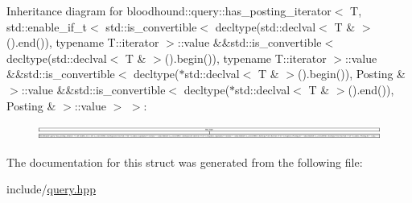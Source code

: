 Inheritance diagram for bloodhound\+:\+:query\+:\+:has\+\_\+posting\+\_\+iterator$<$ T, std\+:\+:enable\+\_\+if\+\_\+t$<$ std\+:\+:is\+\_\+convertible$<$ decltype(std\+:\+:declval$<$ T \& $>$().end()), typename T\+:\+:iterator $>$\+:\+:value \&\&std\+:\+:is\+\_\+convertible$<$ decltype(std\+:\+:declval$<$ T \& $>$().begin()), typename T\+:\+:iterator $>$\+:\+:value \&\&std\+:\+:is\+\_\+convertible$<$ decltype($\ast$std\+:\+:declval$<$ T \& $>$().begin()), Posting \& $>$\+:\+:value \&\&std\+:\+:is\+\_\+convertible$<$ decltype($\ast$std\+:\+:declval$<$ T \& $>$().end()), Posting \& $>$\+:\+:value $>$ $>$\+:\begin{figure}[H]
\begin{center}
\leavevmode
\includegraphics[height=0.480069cm]{structbloodhound_1_1query_1_1has__posting__iterator_3_01T_00_01std_1_1enable__if__t_3_01std_1_1i3aad327a30d60305d06d5c73680c1a38}
\end{center}
\end{figure}


The documentation for this struct was generated from the following file\+:\begin{DoxyCompactItemize}
\item 
include/\mbox{\hyperlink{query_8hpp}{query.\+hpp}}\end{DoxyCompactItemize}
